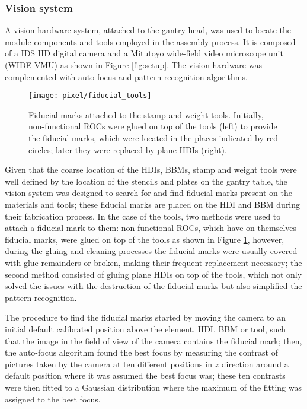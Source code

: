 \subsubsection*{Vision system}

A vision hardware system, attached to the gantry head, was used to locate the module components and tools employed in the assembly process. It is composed of a IDS HD digital camera and a Mitutoyo wide-field video microscope unit (WIDE VMU) as shown in Figure \ref{fig:setup}. The vision hardware was complemented with auto-focus and pattern recognition algorithms. 

\begin{figure}[!h]
  \centering  
  \texttt{[image: pixel/fiducial\_tools]}\\
  \caption[Fiducial marks on tools.]{Fiducial marks attached to the stamp and weight tools. Initially, non-functional ROCs were glued on top of the tools (left) to provide the fiducial marks, which were located in the places indicated by red circles; later they were replaced by plane HDIs (right).}\label{fig:fiducial_tools}
\end{figure}

Given that the coarse location of the HDIs, BBMs, stamp and weight tools were well defined by the location of the stencils and plates on the gantry table, the vision system was designed to search for and find fiducial marks present on the materials and tools; these fiducial marks are placed on the HDI and BBM during their fabrication process. In the case of the tools, two methods were used to attach a fiducial mark to them: non-functional ROCs, which have on themselves fiducial marks, were glued on top of the tools as shown in Figure \ref{fig:fiducial_tools}, however, during the gluing and cleaning processes the fiducial marks were usually covered with glue remainders or broken, making their frequent replacement necessary; the second method consisted of gluing plane HDIs on top of the tools, which not only solved the issues with the destruction of the fiducial marks but also simplified the pattern recognition.

The procedure to find the fiducial marks started by moving the camera to an initial default calibrated position above the element, HDI, BBM or tool, such that the image in the field of view of the camera contains the fiducial mark; then, the auto-focus algorithm found the best focus by measuring the contrast of pictures taken by the camera at ten different positions in $z$ direction around a default position where it was assumed the best focus was; these ten contrasts were then fitted to a Gaussian distribution where the maximum of the fitting was assigned to the best focus.     

